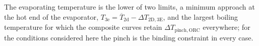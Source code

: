 %

The evaporating temperature is the lower of two limits, a minimum approach
at the hot end of the evaporator,
$T_\mathrm{3e}=\overline{T}_\mathrm{2d}-\Delta T_\mathrm{2D,3E}$, and the
largest boiling temperature for which the composite curves retain
$\Delta T_\mathrm{pinch,ORC}$ everywhere; for the conditions considered here
the pinch is the binding constraint in every case.

